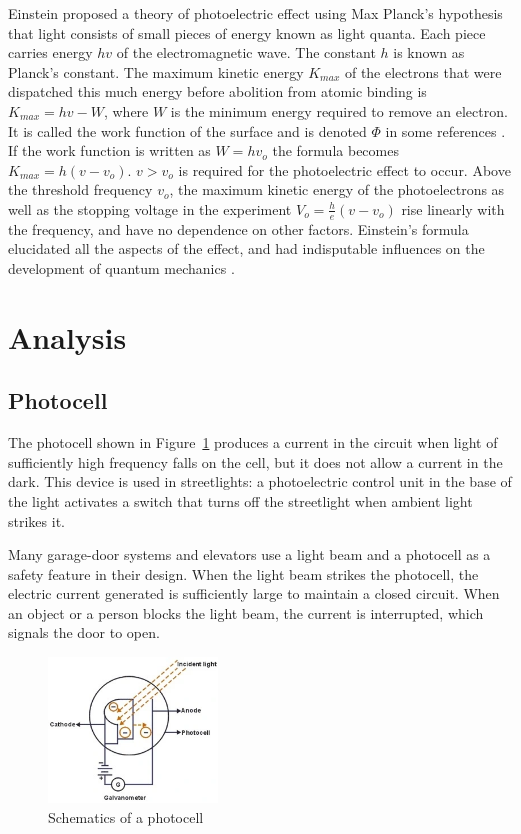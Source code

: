 \documentclass[stu, a4paper, 12pt, floatsintext]{apa7}
\begin{document}
Einstein proposed a theory of photoelectric effect using Max Planck's hypothesis
that light consists of small pieces of energy known as light quanta. Each
piece carries energy $hv$ of the electromagnetic wave. The constant $h$ is known
as Planck's constant. The maximum kinetic energy $K_{max}$ of the electrons that
were dispatched this much energy before abolition from atomic binding is
$K_{max}=hv-W$, where $W$ is the minimum energy required to remove an electron.
It is called the work function of the surface and is denoted $\Phi$ in some
references \parencite{physics}. If the work function is written as $W=hv_o$ the
formula becomes $K_{max}=h(v-v_o)$. $v>v_o$ is required for the photoelectric
effect to occur. Above the threshold frequency $v_o$, the maximum kinetic energy
of the photoelectrons as well as the stopping voltage in the experiment
$V_o=\frac{h}{e}(v-v_o)$ rise linearly with the frequency, and have no
dependence on other factors. Einstein's formula elucidated all the aspects of
the effect, and had indisputable influences on the development of quantum
mechanics \parencite{quantum}.

\section{Analysis}

\subsection{Photocell}

The photocell shown in Figure~\ref{fig:photocell} produces a current in the
circuit when light of sufficiently high frequency falls on the cell, but it does
not allow a current in the dark. This device is used in streetlights: a
photoelectric control unit in the base of the light activates a switch that
turns off the streetlight when ambient light strikes it.

Many garage-door systems and elevators use a light beam and a photocell as a
safety feature in their design. When the light beam strikes the photocell, the
electric current generated is sufficiently large to maintain a closed circuit.
When an object or a person blocks the light beam, the current is interrupted,
which signals the door to open.

\begin{figure}[htpb]
    \centering
    \includegraphics[width=0.4\textwidth]{imgs/photocell.png}
    \caption{Schematics of a photocell}
    \label{fig:photocell}
\end{figure}
\end{document}
